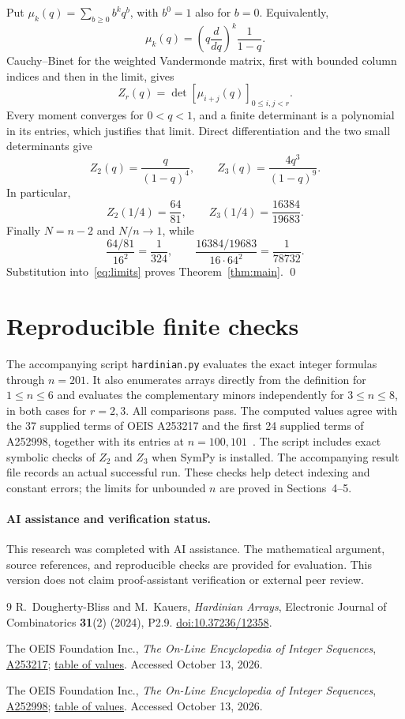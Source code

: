 \documentclass[11pt]{article}
\begin{document}
Put $\mu_k(q)=\sum_{b\ge0}b^kq^b$, with $b^0=1$ also for $b=0$.
Equivalently,
\[
 \mu_k(q)=\left(q\frac{d}{dq}\right)^k\frac1{1-q}.
\]
Cauchy--Binet for the weighted Vandermonde matrix, first with bounded
column indices and then in the limit, gives
\[
 Z_r(q)=\det[\mu_{i+j}(q)]_{0\le i,j<r}.
\]
Every moment converges for $0<q<1$, and a finite determinant is a
polynomial in its entries, which justifies that limit. Direct
differentiation and the two small determinants give
\[
 Z_2(q)=\frac q{(1-q)^4},\qquad
 Z_3(q)=\frac{4q^3}{(1-q)^9}.
\]
In particular,
\[
 Z_2(1/4)=\frac{64}{81},\qquad
 Z_3(1/4)=\frac{16384}{19683}.
\]
Finally $N=n-2$ and $N/n\to1$, while
\[
 \frac{64/81}{16^2}=\frac1{324},\qquad
 \frac{16384/19683}{16\cdot64^2}=\frac1{78732}.
\]
Substitution into~\eqref{eq:limits} proves Theorem~\ref{thm:main}.
\qed

\section{Reproducible finite checks}

The accompanying script \texttt{hardinian.py} evaluates the exact
integer formulas through $n=201$. It also enumerates arrays directly
from the definition for $1\le n\le6$ and evaluates the complementary
minors independently for $3\le n\le8$, in both cases for $r=2,3$.
All comparisons pass. The computed values agree with the 37 supplied
terms of OEIS A253217 and the first 24 supplied terms of A252998,
together with its entries at $n=100,101$~\cite{oeis2,oeis3}.
The script includes exact symbolic checks of $Z_2$ and $Z_3$ when
SymPy is installed. The accompanying result file records an actual
successful run. These checks help detect indexing and constant errors;
the limits for unbounded $n$ are proved in Sections~4--5.

\paragraph{AI assistance and verification status.}
This research was completed with AI assistance. The mathematical
argument, source references, and reproducible checks are provided for
evaluation. This version does not claim proof-assistant verification
or external peer review.

\begin{thebibliography}{9}
R.~Dougherty-Bliss and M.~Kauers,
\emph{Hardinian Arrays},
Electronic Journal of Combinatorics \textbf{31}(2) (2024), P2.9.
\href{https://doi.org/10.37236/12358}{doi:10.37236/12358}.

The OEIS Foundation Inc.,
\emph{The On-Line Encyclopedia of Integer Sequences},
\href{https://oeis.org/A253217}{A253217};
\href{https://oeis.org/A253217/b253217.txt}{table of values}.
Accessed October 13, 2026.

The OEIS Foundation Inc.,
\emph{The On-Line Encyclopedia of Integer Sequences},
\href{https://oeis.org/A252998}{A252998};
\href{https://oeis.org/A252998/b252998.txt}{table of values}.
Accessed October 13, 2026.
\end{thebibliography}
\end{document}
